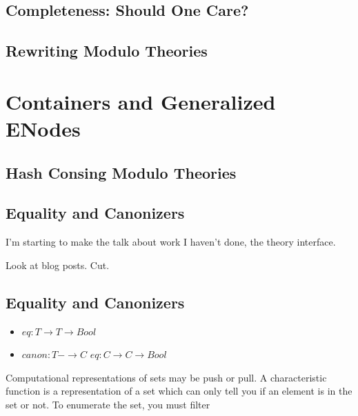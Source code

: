     \subsection{Completeness: Should One Care?}

    \subsection{Rewriting Modulo Theories}

    \section{Containers and Generalized ENodes}

    \subsection{Hash Consing Modulo Theories} %




    \subsection{Equality and Canonizers}


    I'm starting to make the talk about work I haven't done, the theory interface.


Look at blog posts.
Cut.









\subsection{Equality and Canonizers}




\begin{itemize}

\item $eq : T \rightarrow T \rightarrow Bool$
\item $canon : T -\rightarrow C$ $eq: C \rightarrow C \rightarrow Bool$

\end{itemize}


Computational representations of sets may be push or pull. A characteristic function is a representation of a set which can only tell you if an element is in the set or not. To enumerate the set, you must filter

